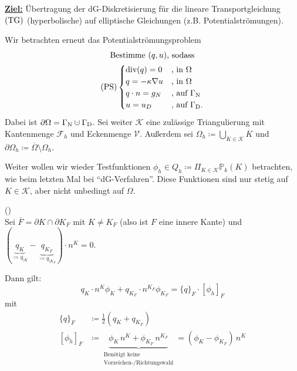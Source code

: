 
\underline{\textbf{Ziel:}} Übertragung der dG-Diskretisierung für die lineare Transportgleichung $ \operatorname{(TG)} $ (hyperbolische) auf elliptische Gleichungen (z.B. Potentialströmungen).

Wir betrachten erneut das Potentialströmungsproblem
\begin{gather*}
	\text{Bestimme } (q, u) \text{, sodass}\\
	\operatorname{(PS)} \begin{cases}
		\operatorname{div}(q) = 0 &\text{, in }\Omega\\
		q = - \kappa \nabla u &\text{, in } \Omega\\
		q \cdot n = g_N &\text{, auf }\Gamma_{\text{N}}\\
		u = u_D &\text{, auf } \Gamma_{\text{D}}. 
	\end{cases}
\end{gather*}
Dabei ist $ \partial \Omega = \GammaN \cupdot \GammaD $. Sei weiter $ \mathcal{K} $ eine zulässige Triangulierung mit Kantenmenge $ \mathcal{F}_h $ und Eckenmenge $ \mathcal{V} $. Außerdem sei $ \Omega_h \coloneqq \bigcup_{K \in \mathcal{K}} K$ und $ \partial \Omega_h \coloneqq \overline{\Omega} \setminus \Omega_h $.

Weiter wollen wir wieder Testfunktionen $ \phi_h \in Q_h \coloneqq \Pi_{K \in \mathcal{K}} \mathbb{P}_k(K)$ betrachten, wie beim letzten Mal bei \enquote{dG-Verfahren}. Diese Funktionen sind nur stetig auf $ K \in \mathcal{K} $, aber nicht unbedingt auf $ \Omega $. 


\begin{Satz}()\\
	Sei $ \overline{F} = \partial K \cap \partial K_F $ mit $ K \ne K_F $ (also ist $ F $ eine innere Kante) und $ ( \underbrace{q_{K} }_{\coloneqq q_{|K}}- \underbrace{q_{K_F}}_{\coloneqq q_{|K_F}} )  \cdot n^K = 0$.
	
	Dann gilt:
	\[ q_K \cdot n^K \phi_K + q_{K_F} \cdot n^{K_F} \phi_{K_F} = \{q\}_F \cdot [\phi_h]_F \]
	mit
	\begin{align*}
		\{q\}_F &\coloneqq \frac{1}{2} (q_K + q_{K_F})\\
		[\phi_h]_F &\coloneqq \underbrace{\phi_K \, n^K + \phi_{K_F} \, n^{K_F}}_{\substack{\text{Benötigt keine}\\ \text{Vorzeichen-/Richtungswahl}}} = (\phi_K - \phi_{K_F}) \, n^K
	\end{align*}
\end{Satz}

